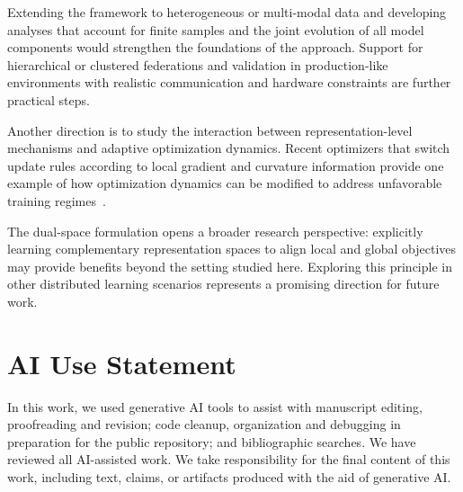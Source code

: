 \documentclass[twoside]{article}
\theoremstyle{thmstyleone}%
\theoremstyle{thmstyletwo}%
\theoremstyle{thmstylethree}%
\begin{document}
Extending the framework to heterogeneous or multi-modal data and developing
analyses that account for finite samples and the joint evolution of all model
components would strengthen the foundations of the approach. Support for hierarchical or clustered federations and validation in production-like environments with realistic communication and hardware constraints are further practical steps.

Another direction is to study the interaction between representation-level mechanisms and adaptive optimization dynamics. Recent optimizers that switch update rules according to local gradient and curvature information provide one example of how optimization dynamics can be modified to address unfavorable training regimes~\cite{dicecco2027eva}.

The dual-space formulation opens a broader research perspective: explicitly learning complementary representation spaces to align local and global objectives may provide benefits beyond the setting studied here. Exploring this principle in other distributed learning scenarios represents a promising direction for future work.


\section*{AI Use Statement}

In this work, we used generative AI tools to assist with manuscript editing, proofreading and revision; code cleanup, organization and debugging in preparation for the public repository; and bibliographic searches. We have reviewed all AI-assisted work. We take responsibility for the final content of this work, including text, claims, or artifacts produced with the aid of generative AI. 










\end{document}

